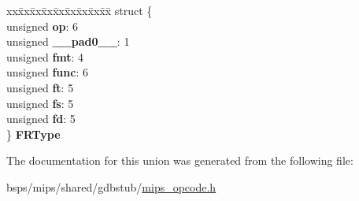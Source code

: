 \begin{DoxyCompactItemize}
\begin{tabbing}
\end{tabbing}\item 
\mbox{\label{unionInstFmt_a50924735f02968d216b76f5e0108e499}} 
\begin{tabbing}
xx\=xx\=xx\=xx\=xx\=xx\=xx\=xx\=xx\=\kill
struct \{\\
\>unsigned {\bfseries op}: 6\\
\>unsigned {\bfseries \_\_pad0\_\_}: 1\\
\>unsigned {\bfseries fmt}: 4\\
\>unsigned {\bfseries func}: 6\\
\>unsigned {\bfseries ft}: 5\\
\>unsigned {\bfseries fs}: 5\\
\>unsigned {\bfseries fd}: 5\\
\} {\bfseries FRType}\\

\end{tabbing}\end{DoxyCompactItemize}


The documentation for this union was generated from the following file\+:\begin{DoxyCompactItemize}
\item 
bsps/mips/shared/gdbstub/\mbox{\hyperlink{mips__opcode_8h}{mips\+\_\+opcode.\+h}}\end{DoxyCompactItemize}
